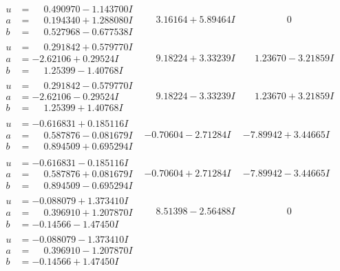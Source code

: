 \documentclass[1p]{elsarticle_modified}
\theoremstyle{definition}
\begin{document}
$$\begin{array}{c|c|c}
\begin{aligned}
u &= \phantom{-}0.490970 - 1.143700 I \\
a &= \phantom{-}0.194340 + 1.288080 I \\
b &= \phantom{-}0.527968 - 0.677538 I\end{aligned}
 & \phantom{-}3.16164 + 5.89464 I & \phantom{-0.000000 } 0 \\ \hline\begin{aligned}
u &= \phantom{-}0.291842 + 0.579770 I \\
a &= -2.62106 + 0.29524 I \\
b &= \phantom{-}1.25399 - 1.40768 I\end{aligned}
 & \phantom{-}9.18224 + 3.33239 I & \phantom{-}1.23670 - 3.21859 I \\ \hline\begin{aligned}
u &= \phantom{-}0.291842 - 0.579770 I \\
a &= -2.62106 - 0.29524 I \\
b &= \phantom{-}1.25399 + 1.40768 I\end{aligned}
 & \phantom{-}9.18224 - 3.33239 I & \phantom{-}1.23670 + 3.21859 I \\ \hline\begin{aligned}
u &= -0.616831 + 0.185116 I \\
a &= \phantom{-}0.587876 - 0.081679 I \\
b &= \phantom{-}0.894509 + 0.695294 I\end{aligned}
 & -0.70604 - 2.71284 I & -7.89942 + 3.44665 I \\ \hline\begin{aligned}
u &= -0.616831 - 0.185116 I \\
a &= \phantom{-}0.587876 + 0.081679 I \\
b &= \phantom{-}0.894509 - 0.695294 I\end{aligned}
 & -0.70604 + 2.71284 I & -7.89942 - 3.44665 I \\ \hline\begin{aligned}
u &= -0.088079 + 1.373410 I \\
a &= \phantom{-}0.396910 + 1.207870 I \\
b &= -0.14566 - 1.47450 I\end{aligned}
 & \phantom{-}8.51398 - 2.56488 I & \phantom{-0.000000 } 0 \\ \hline\begin{aligned}
u &= -0.088079 - 1.373410 I \\
a &= \phantom{-}0.396910 - 1.207870 I \\
b &= -0.14566 + 1.47450 I\end{aligned}

\end{array}$$
\end{document}
